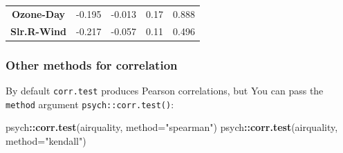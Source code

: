 \documentclass[]{article}
\newenvironment{Shaded}{\begin{snugshade}}{\end{snugshade}}
\newcommand{\KeywordTok}[1]{\textcolor[rgb]{0.13,0.29,0.53}{\textbf{#1}}}
\newcommand{\DataTypeTok}[1]{\textcolor[rgb]{0.13,0.29,0.53}{#1}}
\newcommand{\StringTok}[1]{\textcolor[rgb]{0.31,0.60,0.02}{#1}}
\newcommand{\OperatorTok}[1]{\textcolor[rgb]{0.81,0.36,0.00}{\textbf{#1}}}
\newcommand{\NormalTok}[1]{#1}
\theoremstyle{definition}
\theoremstyle{definition}
\theoremstyle{definition}
\theoremstyle{remark}
\begin{document}
\begin{longtable}[]{@{}ccccc@{}}
\begin{minipage}[t]{0.21\columnwidth}\centering\strut
\textbf{Ozone-Day}\strut
\end{minipage} & \begin{minipage}[t]{0.11\columnwidth}\centering\strut
-0.195\strut
\end{minipage} & \begin{minipage}[t]{0.11\columnwidth}\centering\strut
-0.013\strut
\end{minipage} & \begin{minipage}[t]{0.10\columnwidth}\centering\strut
0.17\strut
\end{minipage} & \begin{minipage}[t]{0.10\columnwidth}\centering\strut
0.888\strut
\end{minipage}\tabularnewline
\begin{minipage}[t]{0.21\columnwidth}\centering\strut
\textbf{Slr.R-Wind}\strut
\end{minipage} & \begin{minipage}[t]{0.11\columnwidth}\centering\strut
-0.217\strut
\end{minipage} & \begin{minipage}[t]{0.11\columnwidth}\centering\strut
-0.057\strut
\end{minipage} & \begin{minipage}[t]{0.10\columnwidth}\centering\strut
0.11\strut
\end{minipage} & \begin{minipage}[t]{0.10\columnwidth}\centering\strut
0.496\strut
\end{minipage}\tabularnewline
\bottomrule
\end{longtable}

\subsubsection*{Other methods for
correlation}\label{correlation-methods}

By default \texttt{corr.test} produces Pearson correlations, but You can
pass the \texttt{method} argument \texttt{psych::corr.test()}:

\begin{Shaded}
\begin{Highlighting}[]
\NormalTok{psych}\OperatorTok{::}\KeywordTok{corr.test}\NormalTok{(airquality, }\DataTypeTok{method=}\StringTok{"spearman"}\NormalTok{)}
\NormalTok{psych}\OperatorTok{::}\KeywordTok{corr.test}\NormalTok{(airquality, }\DataTypeTok{method=}\StringTok{"kendall"}\NormalTok{)}
\end{Highlighting}
\end{Shaded}
\end{document}
